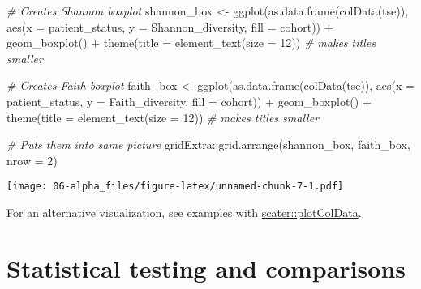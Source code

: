 \documentclass[
  oneside]{book}
\newenvironment{Shaded}{\begin{snugshade}}{\end{snugshade}}
\newcommand{\AttributeTok}[1]{\textcolor[rgb]{0.77,0.63,0.00}{#1}}
\newcommand{\CommentTok}[1]{\textcolor[rgb]{0.56,0.35,0.01}{\textit{#1}}}
\newcommand{\DecValTok}[1]{\textcolor[rgb]{0.00,0.00,0.81}{#1}}
\newcommand{\FunctionTok}[1]{\textcolor[rgb]{0.00,0.00,0.00}{#1}}
\newcommand{\NormalTok}[1]{#1}
\newcommand{\OtherTok}[1]{\textcolor[rgb]{0.56,0.35,0.01}{#1}}
\newcommand{\SpecialCharTok}[1]{\textcolor[rgb]{0.00,0.00,0.00}{#1}}
\begin{document}
\begin{Shaded}
\begin{Highlighting}[]
\CommentTok{\# Creates Shannon boxplot }
\NormalTok{shannon\_box }\OtherTok{\textless{}{-}} \FunctionTok{ggplot}\NormalTok{(}\FunctionTok{as.data.frame}\NormalTok{(}\FunctionTok{colData}\NormalTok{(tse)),}
  \FunctionTok{aes}\NormalTok{(}\AttributeTok{x =}\NormalTok{ patient\_status, }
      \AttributeTok{y =}\NormalTok{ Shannon\_diversity,}
      \AttributeTok{fill =}\NormalTok{ cohort)) }\SpecialCharTok{+} 
  \FunctionTok{geom\_boxplot}\NormalTok{() }\SpecialCharTok{+}
  \FunctionTok{theme}\NormalTok{(}\AttributeTok{title =} \FunctionTok{element\_text}\NormalTok{(}\AttributeTok{size =} \DecValTok{12}\NormalTok{)) }\CommentTok{\# makes titles smaller}

\CommentTok{\# Creates Faith boxplot }
\NormalTok{faith\_box }\OtherTok{\textless{}{-}} \FunctionTok{ggplot}\NormalTok{(}\FunctionTok{as.data.frame}\NormalTok{(}\FunctionTok{colData}\NormalTok{(tse)), }\FunctionTok{aes}\NormalTok{(}\AttributeTok{x =}\NormalTok{ patient\_status, }
                                                     \AttributeTok{y =}\NormalTok{ Faith\_diversity, }
                                                     \AttributeTok{fill =}\NormalTok{ cohort)) }\SpecialCharTok{+} 
  \FunctionTok{geom\_boxplot}\NormalTok{() }\SpecialCharTok{+}
  \FunctionTok{theme}\NormalTok{(}\AttributeTok{title =} \FunctionTok{element\_text}\NormalTok{(}\AttributeTok{size =} \DecValTok{12}\NormalTok{)) }\CommentTok{\# makes titles smaller}

\CommentTok{\# Puts them into same picture}
\NormalTok{gridExtra}\SpecialCharTok{::}\FunctionTok{grid.arrange}\NormalTok{(shannon\_box, faith\_box, }\AttributeTok{nrow =} \DecValTok{2}\NormalTok{)}
\end{Highlighting}
\end{Shaded}

\texttt{[image: 06-alpha\_files/figure-latex/unnamed-chunk-7-1.pdf]}

For an alternative visualization, see examples with \href{https://microbiome.github.io/OMA/microbiome-diversity.html\#alpha-diversity}{scater::plotColData}.

\hypertarget{statistical-testing-and-comparisons}{%
\section{Statistical testing and comparisons}\label{statistical-testing-and-comparisons}}
\end{document}
